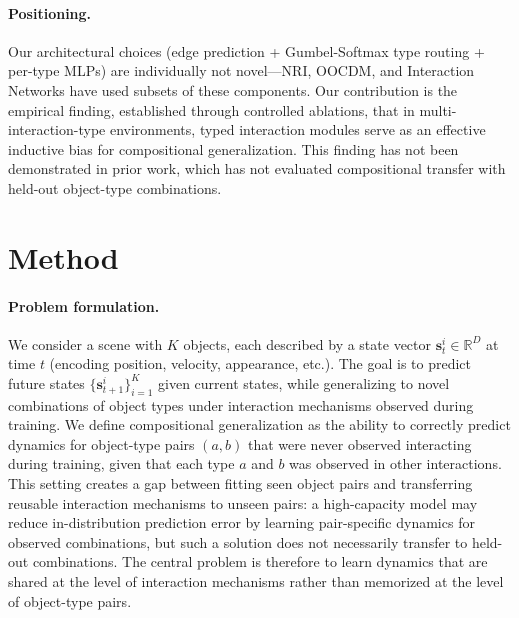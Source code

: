 \documentclass{article}
\newcommand{\R}{\mathbb{R}}
\begin{document}
\paragraph{Positioning.} Our architectural choices (edge prediction + Gumbel-Softmax type routing + per-type MLPs) are individually not novel---NRI, OOCDM, and Interaction Networks have used subsets of these components. Our contribution is the empirical finding, established through controlled ablations, that in multi-interaction-type environments, typed interaction modules serve as an effective inductive bias for compositional generalization. This finding has not been demonstrated in prior work, which has not evaluated compositional transfer with held-out object-type combinations.

\section{Method}
\label{sec:method}

\paragraph{Problem formulation.}
We consider a scene with $K$ objects, each described by a state vector $\mathbf{s}_t^i \in \R^D$ at time $t$ (encoding position, velocity, appearance, etc.). The goal is to predict future states $\{\mathbf{s}_{t+1}^i\}_{i=1}^K$ given current states, while generalizing to novel combinations of object types under interaction mechanisms observed during training. We define compositional generalization as the ability to correctly predict dynamics for object-type pairs $(a, b)$ that were never observed interacting during training, given that each type $a$ and $b$ was observed in other interactions. This setting creates a gap between fitting seen object pairs and transferring reusable interaction mechanisms to unseen pairs: a high-capacity model may reduce in-distribution prediction error by learning pair-specific dynamics for observed combinations, but such a solution does not necessarily transfer to held-out combinations. The central problem is therefore to learn dynamics that are shared at the level of interaction mechanisms rather than memorized at the level of object-type pairs.
\end{document}
